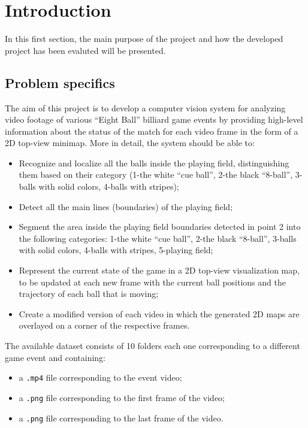 \section{Introduction}

In this first section, the main purpose of the project and how the developed project has been evaluted will be presented.


\subsection{Problem specifics}
The aim of this project is to develop a computer vision system for analyzing video footage of various “Eight Ball”
billiard game events by providing high-level information about the status of the match for each video frame in the form of a 
2D top-view minimap.
\newline
More in detail, the system should be able to:
\begin{itemize}
    \item Recognize and localize all the balls inside the playing field, distinguishing them based on their category (1-the
    white “cue ball”, 2-the black “8-ball”, 3-balls with solid colors, 4-balls with stripes);
    \item Detect all the main lines (boundaries) of the playing field;
    \item Segment the area inside the playing field boundaries detected in point 2 into the following categories: 1-the
    white “cue ball”, 2-the black “8-ball”, 3-balls with solid colors, 4-balls with stripes, 5-playing field;
    \item Represent the current state of the game in a 2D top-view visualization map, to be updated at each new frame
    with the current ball positions and the trajectory of each ball that is moving;
    \item Create a modified version of each video in which the generated 2D maps are 
    overlayed on a corner of the respective frames.
\end{itemize}

\noindent
The available dataset consists of 10 folders each one corresponding to a different game event and containing:
\begin{itemize}
    \item a \verb|.mp4| file corresponding to the event video;
    \item a \verb|.png| file corresponding to the first frame of the video;
    \item a \verb|.png| file corresponding to the last frame of the video.
\end{itemize}

